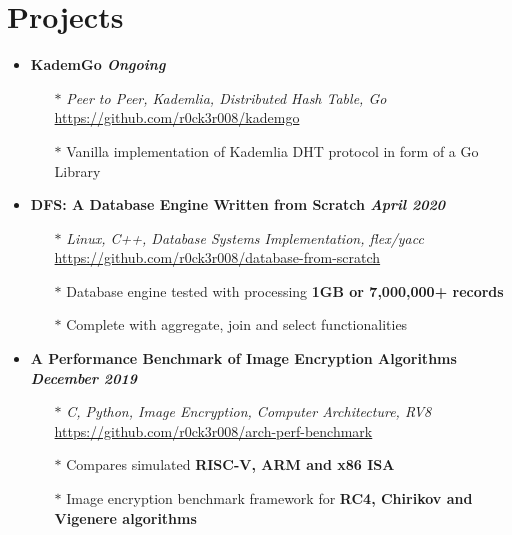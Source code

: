 \documentclass[10pt,a4paper]{article}
\begin{document}
\section{{\faCode} Projects}
	\begin{itemize}[noitemsep,nolistsep]

		\item\textbf{KademGo \hfill \textit{Ongoing}}
			\begin{itemize}[leftmargin=*]
				\setlength\itemsep{-0.25em}
				\item[$\ast$]\textit{Peer to Peer, Kademlia, Distributed Hash Table, Go} \hfill \href{https://github.com/r0ck3r008/kademgo}{{\scriptsize https://github.com/r0ck3r008/kademgo}}
				\item[$\ast$]Vanilla implementation of Kademlia DHT protocol in form of a Go Library
			\end{itemize}

		\item\textbf{DFS: A Database Engine Written from Scratch \hfill \textit{April 2020}}
			\begin{itemize}[leftmargin=*]
				\setlength\itemsep{-0.25em}
				\item[$\ast$]\textit{Linux, C++, Database Systems Implementation, flex/yacc} \hfill \href{https://github.com/r0ck3r008/database-from-scratch}{{\scriptsize https://github.com/r0ck3r008/database-from-scratch}}
				\item[$\ast$]Database engine tested with processing \textbf{1GB or 7,000,000+ records}
				\item[$\ast$]Complete with aggregate, join and select functionalities
			\end{itemize}

		\item\textbf{A Performance Benchmark of Image Encryption Algorithms \hfill \textit{December 2019}}
			\begin{itemize}[leftmargin=*]
				\setlength\itemsep{-0.25em}
				\item[$\ast$]\textit{C, Python, Image Encryption, Computer Architecture, RV8} \hfill \href{https://github.com/r0ck3r008/arch-perf-benchmark}{{\scriptsize https://github.com/r0ck3r008/arch-perf-benchmark}}
				\item[$\ast$]Compares simulated \textbf{RISC-V, ARM and x86 ISA}
				\item[$\ast$]Image encryption benchmark framework for \textbf{RC4, Chirikov and Vigenere algorithms}
			\end{itemize}


\end{itemize}
\end{document}
